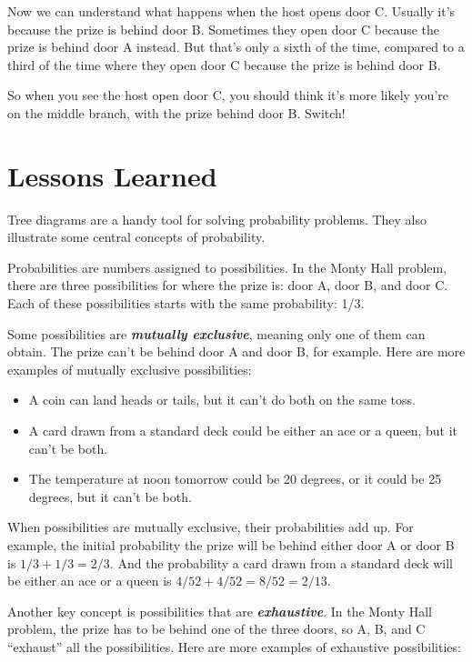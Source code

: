\documentclass[justified]{tufte-book}
\providecommand{\tightlist}{%
  \setlength{\itemsep}{0pt}\setlength{\parskip}{0pt}}
\theoremstyle{definition}
\theoremstyle{definition}
\theoremstyle{definition}
\theoremstyle{definition}
\theoremstyle{remark}
\begin{document}
Now we can understand what happens when the host opens door C. Usually it's because the prize is behind door B. Sometimes they open door C because the prize is behind door A instead. But that's only a sixth of the time, compared to a third of the time where they open door C because the prize is behind door B.

So when you see the host open door C, you should think it's more likely you're on the middle branch, with the prize behind door B. Switch!

\hypertarget{lessons}{%
\section{Lessons Learned}\label{lessons}}

Tree diagrams are a handy tool for solving probability problems. They also illustrate some central concepts of probability.

Probabilities are numbers assigned to possibilities. In the Monty Hall problem, there are three possibilities for where the prize is: door A, door B, and door C. Each of these possibilities starts with the same probability: 1/3.

Some possibilities are \textbf{\emph{mutually exclusive}}, meaning only one of them can obtain. The prize can't be behind door A and door B, for example. Here are more examples of mutually exclusive possibilities:

\begin{itemize}
\tightlist
\item
  A coin can land heads or tails, but it can't do both on the same toss.
\item
  A card drawn from a standard deck could be either an ace or a queen, but it can't be both.
\item
  The temperature at noon tomorrow could be 20 degrees, or it could be 25 degrees, but it can't be both.
\end{itemize}

When possibilities are mutually exclusive, their probabilities add up. For example, the initial probability the prize will be behind either door A or door B is \(1/3 + 1/3 = 2/3\). And the probability a card drawn from a standard deck will be either an ace or a queen is \(4/52 + 4/52 = 8/52 = 2/13\).

Another key concept is possibilities that are \textbf{\emph{exhaustive}}. In the Monty Hall problem, the prize has to be behind one of the three doors, so A, B, and C ``exhaust'' all the possibilities. Here are more examples of exhaustive possibilities:
\end{document}
